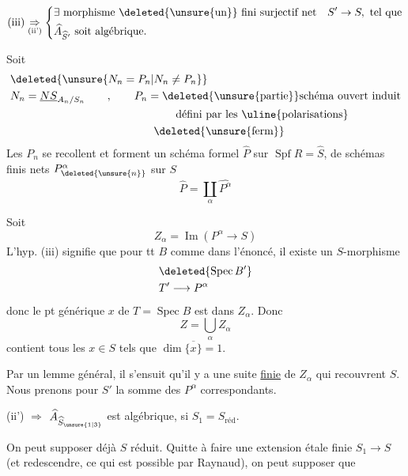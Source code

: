 

\[
\text{(iii)}\underset{\text{(ii')}}{\Rightarrow}\left\{\begin{aligned}
&\exists\ \text{morphisme \deleted{\unsure{un}} fini surjectif net}\quad S'\to S,\ \text{tel que}\\
&\widehat A_{\widehat S'}\ \text{soit algébrique.}
\end{aligned}\right.
\]

Soit
\[
\begin{aligned}
&\deleted{\unsure{N_n=P_n|N_n\neq P_n}}\\
&N_n=\underline{NS}_{A_n/S_n}\qquad,\qquad
P_n=\text{\deleted{\unsure{partie}}schéma ouvert induit}\\
&\hspace{15em}\text{défini par les \uline{polarisations}}\\
&\hspace{13em}\text{\deleted{\unsure{ferm}}}
\end{aligned}
\]
Les $P_n$ se recollent et forment un schéma formel $\widehat P$ sur $\operatorname{Spf} R=\widehat S$,   de schémas finis nets $P^\alpha_{\deleted{\unsure{n}}}$ sur $S$
\[
\widehat P=\coprod_\alpha\widehat{P^\alpha}
\]

Soit
\[
Z_\alpha=\operatorname{Im}(P^\alpha\to S)
\]
L'hyp. (iii) signifie que pour tt $B$ comme dans l'énoncé, il existe un  $S$-morphisme \unsure{$\backslash$|!}
\[
\begin{aligned}
&\deleted{\operatorname{Spec} B'}\\
&T'\longrightarrow P^\alpha
\end{aligned}
\]
donc le pt générique $x$ de $T=\operatorname{Spec} B$ est dans $Z_\alpha$. Donc
\[
Z=\bigcup_\alpha Z_\alpha
\]
contient tous les $x\in S$ tels que $\dim\overline{\{x\}}=1$.

Par un lemme général, il s'ensuit qu'il y a une suite \uline{finie} de $Z_\alpha$ qui recouvrent $S$. Nous prenons pour $S'$  la somme des $P^\alpha$ correspondants.

(ii') $\Rightarrow$   $\widehat A_{\widehat S_{\unsure{1|3}}}$ est algébrique, si $S_1=S_{\text{réd}}$.

On peut supposer déjà $S$ réduit. Quitte à faire une extension étale finie $S_1\to S$ (et redescendre, \deleted{\unsure{$\exists$}} ce qui est possible par Raynaud), on peut supposer que
